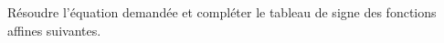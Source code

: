 \documentclass[main.tex]{subfiles}
\begin{document}
\begin{exercise} 
%	
 Résoudre l'équation demandée et compléter le tableau de signe des fonctions affines suivantes.
	

\end{exercise}
\end{document}
